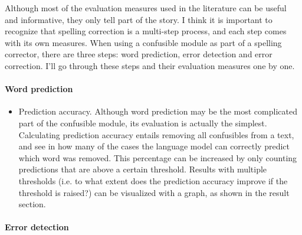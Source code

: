 \documentclass[12pt]{article}
\begin{document}
Although most of the evaluation measures used in the literature can be useful and informative, they only tell part of the story. I think it is important to recognize that spelling correction is a multi-step process, and each step comes with its own measures. When using a confusible module as part of a spelling corrector, there are three steps: word prediction, error detection and error correction. I'll go through these steps and their evaluation measures one by one.

\paragraph{Word prediction}

\begin{itemize}
\item Prediction accuracy. Although word prediction may be the most complicated part of the confusible module, its evaluation is actually the simplest. Calculating prediction accuracy entails removing all confusibles from a text, and see in how many of the cases the language model can correctly predict which word was removed. This percentage can be increased by only counting predictions that are above a certain threshold. Results with multiple thresholds (i.e. to what extent does the prediction accuracy improve if the threshold is raised?) can be visualized with a graph, as shown in the result section.
\end{itemize}

\paragraph{Error detection}
\end{document}
